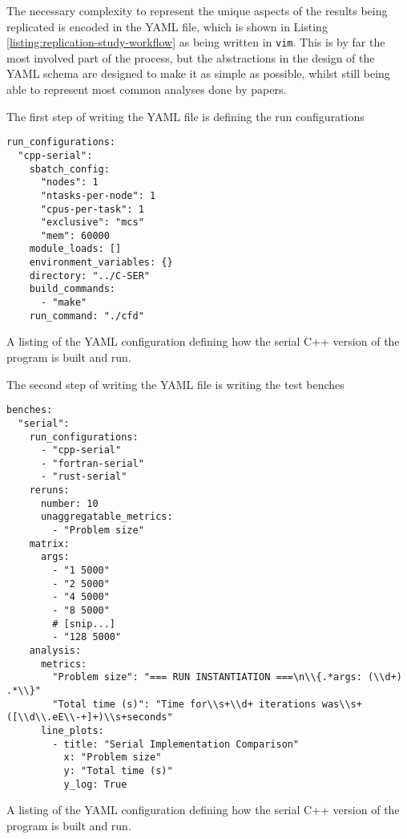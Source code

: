The necessary complexity to represent the unique aspects of the results being replicated is encoded in the YAML file, which is shown in Listing \ref{listing:replication-study-workflow} as being written in \texttt{vim}. This is by far the most involved part of the process, but the abstractions in the design of the YAML schema are designed to make it as simple as possible, whilst still being able to represent most common analyses done by papers.

The first step of writing the YAML file is defining the run configurations

\begin{listing}[H]
    \begin{verbatim}
run_configurations:
  "cpp-serial":
    sbatch_config:
      "nodes": 1
      "ntasks-per-node": 1
      "cpus-per-task": 1
      "exclusive": "mcs"
      "mem": 60000
    module_loads: []
    environment_variables: {}
    directory: "../C-SER"
    build_commands:
      - "make"
    run_command: "./cfd"
    \end{verbatim}
    \caption{A listing of the YAML configuration defining how the serial C++ version of the program is built and run.}
    \label{listing:replication-study-workflow}
\end{listing}

The second step of writing the YAML file is writing the test benches

\begin{listing}[H]
    \begin{verbatim}
benches:
  "serial":
    run_configurations:
      - "cpp-serial"
      - "fortran-serial"
      - "rust-serial"
    reruns:
      number: 10
      unaggregatable_metrics:
        - "Problem size"
    matrix:
      args:
        - "1 5000"
        - "2 5000"
        - "4 5000"
        - "8 5000"
        # [snip...]
        - "128 5000"
    analysis:
      metrics:
        "Problem size": "=== RUN INSTANTIATION ===\n\\{.*args: (\\d+) .*\\}"
        "Total time (s)": "Time for\\s+\\d+ iterations was\\s+([\\d\\.eE\\-+]+)\\s+seconds"
      line_plots:
        - title: "Serial Implementation Comparison"
          x: "Problem size"
          y: "Total time (s)"
          y_log: True
    \end{verbatim}
    \caption{A listing of the YAML configuration defining how the serial C++ version of the program is built and run.}
    \label{listing:replication-study-workflow}
\end{listing}

